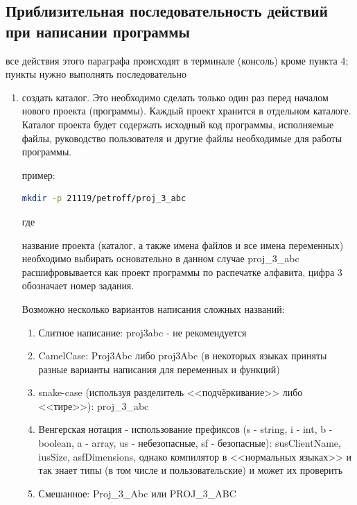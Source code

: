 \documentclass[unicode, 12pt, a4paper,oneside,fleqn]{article}
\begin{document}
\subsection{Приблизительная последовательность действий при написании
  программы}
все действия этого параграфа происходят в терминале (консоль) кроме
пункта 4; пункты нужно выполнять последовательно
\begin{enumerate}
\item создать каталог. Это необходимо сделать только один раз перед
  началом нового проекта (программы). Каждый проект хранится в
  отдельном каталоге. Каталог проекта будет содержать исходный код
  программы, исполняемые файлы, руководство пользователя и другие
  файлы необходимые для работы программы.

  пример:

\begin{lstlisting}[language=bash]
mkdir -p 21119/petroff/proj_3_abc
\end{lstlisting}
  
  где 
  название проекта (каталог, а также имена файлов и все имена
  переменных) необходимо выбирать основательно в данном случае
  proj\_3\_abc расшифровывается как проект программы по распечатке
  алфавита, цифра 3 обозначает номер задания.

  Возможно несколько вариантов написания сложных названий:
  \begin{enumerate}
  \item Слитное написание: proj3abc - не рекомендуется
  \item CamelCase: Proj3Abc либо proj3Abc (в некоторых языках приняты
    разные варианты написания для переменных и функций)
  \item snake-case (используя разделитель <<подчёркивание>> либо <<тире>>):
    proj\_3\_abc
  \item Венгерская нотация - использование префиксов (s - string, i -
    int, b - boolean, a - array, us - небезопасные, sf - безопасные):
    susClientName, iusSize, asfDimensions, однако компилятор в
    <<нормальных языках>> и так знает типы (в том числе и
    пользовательские) и может их проверить
  \item Смешанное: Proj\_3\_Abc или PROJ\_3\_ABC
  \end{enumerate}




\end{enumerate}
\end{document}

